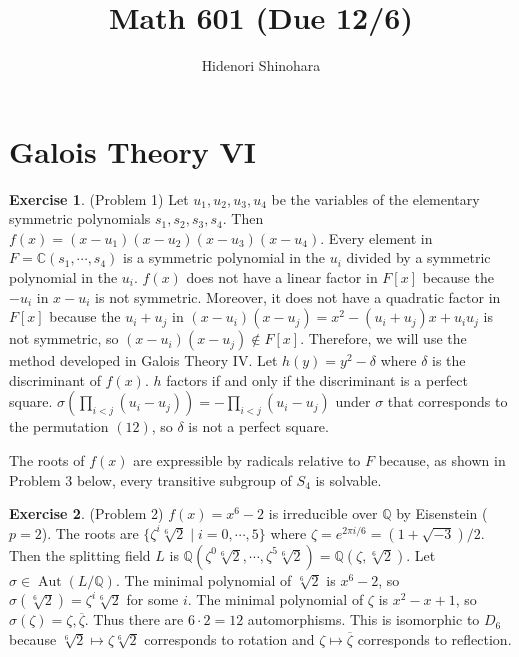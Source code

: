 \documentclass[12pt, psamsfonts]{amsart}
\theoremstyle{definition}
\newtheorem*{exer}{Exercise}
\theoremstyle{remark}
\DeclareMathOperator{\Aut}{Aut}
\numberwithin{equation}{section}
\begin{document}
\title{Math 601 (Due 12/6)}
\author{Hidenori Shinohara}
\maketitle

\tableofcontents

\section{Galois Theory VI}

\begin{exer}{(Problem 1)}
  Let $u_1, u_2, u_3, u_4$ be the variables of the elementary symmetric polynomials $s_1, s_2, s_3, s_4$.
  Then $f(x) = (x - u_1)(x - u_2)(x - u_3)(x - u_4)$.
  Every element in $F = \mathbb{C}(s_1, \cdots, s_4)$ is a symmetric polynomial in the $u_i$ divided by a symmetric polynomial in the $u_i$.
  $f(x)$ does not have a linear factor in $F[x]$ because the $-u_i$ in $x - u_i$ is not symmetric.
  Moreover, it does not have a quadratic factor in $F[x]$ because the $u_i + u_j$ in $(x - u_i)(x - u_j) = x^2 - (u_i + u_j)x + u_iu_j$ is not symmetric, so $(x - u_i)(x - u_j) \notin F[x]$.
  Therefore, we will use the method developed in Galois Theory IV.
  Let $h(y) = y^2 - \delta$ where $\delta$ is the discriminant of $f(x)$.
  $h$ factors if and only if the discriminant is a perfect square.
  $\sigma(\prod_{i < j} (u_i - u_j)) = -\prod_{i < j} (u_i - u_j)$ under $\sigma$ that corresponds to the permutation $(12)$, so $\delta$ is not a perfect square.


  The roots of $f(x)$ are expressible by radicals relative to $F$ because, as shown in Problem 3 below, every transitive subgroup of $S_4$ is solvable.
\end{exer}

\begin{exer}{(Problem 2)}
  $f(x) = x^6 - 2$ is irreducible over $\mathbb{Q}$ by Eisenstein ($p = 2$).
  The roots are $\{ \zeta^{i} \sqrt[6]{2} \mid i = 0, \cdots, 5 \}$ where $\zeta = e^{2\pi i / 6} = (1 + \sqrt{-3}) / 2$.
  Then the splitting field $L$ is $\mathbb{Q}(\zeta^0\sqrt[6]{2}, \cdots, \zeta^5\sqrt[6]{2}) = \mathbb{Q}(\zeta, \sqrt[6]{2})$.
  Let $\sigma \in \Aut(L/\mathbb{Q})$.
  The minimal polynomial of $\sqrt[6]{2}$ is $x^6 - 2$, so $\sigma(\sqrt[6]{2}) = \zeta^i\sqrt[6]{2}$ for some $i$.
  The minimal polynomial of $\zeta$ is $x^2 - x + 1$, so $\sigma(\zeta) = \zeta, \overline{\zeta}$.
  Thus there are $6 \cdot 2 = 12$ automorphisms.
  This is isomorphic to $D_6$ because $\sqrt[6]{2} \mapsto \zeta\sqrt[6]{2}$ corresponds to rotation and $\zeta \mapsto \overline{\zeta}$ corresponds to reflection.
\end{exer}
\end{document}
